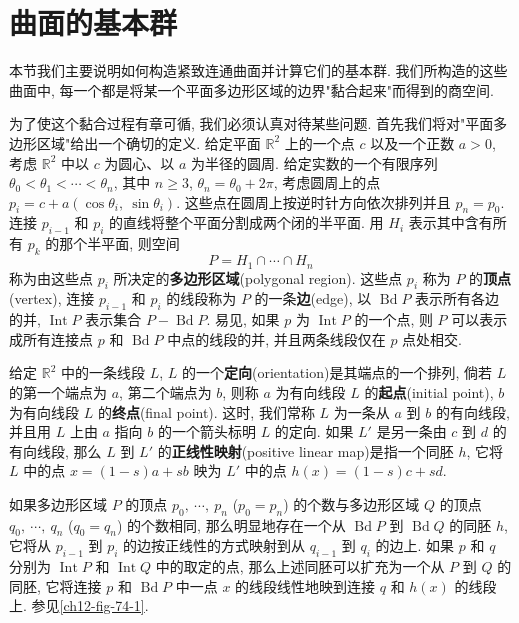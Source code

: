 ﻿\section{曲面的基本群}
\label{ch12-sec74}

本节我们主要说明如何构造紧致连通曲面并计算它们的基本群. 我们所构造的这些曲面中, 每一个都是将某一个平面多边形区域的边界"黏合起来"而得到的商空间.

为了使这个黏合过程有章可循, 我们必须认真对待某些问题. 首先我们将对"平面多边形区域"给出一个确切的定义. 给定平面 $\mathbb{R}^{2}$ 上的一个点 $c$ 以及一个正数 $a>0$, 考虑 $\mathbb{R}^{2}$ 中以 $c$ 为圆心、以 $a$ 为半径的圆周. 给定实数的一个有限序列 $\theta_{0}<\theta_{1}<\cdots<\theta_{n}$, 其中 $n\geqslant 3$, $\theta_{n}=\theta_{0}+2\pi$, 考虑圆周上的点 $p_{i}=c+a(\cos\theta_{i},\ \sin\theta_{i})$. 这些点在圆周上按逆时针方向依次排列并且 $p_{n}=p_{0}$. 连接 $p_{i-1}$ 和 $p_{i}$ 的直线将整个平面分割成两个闭的半平面. 用 $H_{i}$ 表示其中含有所有 $p_{k}$ 的那个半平面, 则空间
\[
P=H_{1}\cap\cdots\cap H_{n}
\]
称为由这些点 $p_{i}$ 所决定的\textbf{多边形区域}(polygonal region). 这些点 $p_{i}$ 称为 $P$ 的\textbf{顶点}(vertex), 连接 $p_{i-1}$ 和 $p_{i}$ 的线段称为 $P$ 的一条\textbf{边}(edge), 以 $\operatorname{Bd}P$ 表示所有各边的并, $\operatorname{Int}P$ 表示集合 $P-\operatorname{Bd}P$. 易见, 如果 $p$ 为 $\operatorname{Int}P$ 的一个点, 则 $P$ 可以表示成所有连接点 $p$ 和 $\operatorname{Bd}P$ 中点的线段的并, 并且两条线段仅在 $p$ 点处相交.

给定 $\mathbb{R}^{2}$ 中的一条线段 $L$, $L$ 的一个\textbf{定向}(orientation)是其端点的一个排列, 倘若 $L$ 的第一个端点为 $a$, 第二个端点为 $b$, 则称 $a$ 为有向线段 $L$ 的\textbf{起点}(initial point), $b$ 为有向线段 $L$ 的\textbf{终点}(final point). 这时, 我们常称 $L$ 为一条从 $a$ 到 $b$ 的有向线段, 并且用 $L$ 上由 $a$ 指向 $b$ 的一个箭头标明 $L$ 的定向. 如果 $L'$ 是另一条由 $c$ 到 $d$ 的有向线段, 那么 $L$ 到 $L'$ 的\textbf{正线性映射}(positive linear map)是指一个同胚 $h$, 它将 $L$ 中的点 $x=(1-s)a+sb$ 映为 $L'$ 中的点 $h(x)=(1-s)c+sd$.

如果多边形区域 $P$ 的顶点 $p_{0},\ \cdots,\ p_{n}$ ($p_{0}=p_{n}$) 的个数与多边形区域 $Q$ 的顶点 $q_{0},\ \cdots,\ q_{n}$ ($q_{0}=q_{n}$) 的个数相同, 那么明显地存在一个从 $\operatorname{Bd}P$ 到 $\operatorname{Bd}Q$ 的同胚 $h$, 它将从 $p_{i-1}$ 到 $p_{i}$ 的边按正线性的方式映射到从 $q_{i-1}$ 到 $q_{i}$ 的边上. 如果 $p$ 和 $q$ 分别为 $\operatorname{Int}P$ 和 $\operatorname{Int}Q$ 中的取定的点, 那么上述同胚可以扩充为一个从 $P$ 到 $Q$ 的同胚, 它将连接 $p$ 和 $\operatorname{Bd}P$ 中一点 $x$ 的线段线性地映到连接 $q$ 和 $h(x)$ 的线段上. 参见\cref{ch12-fig-74-1}.

